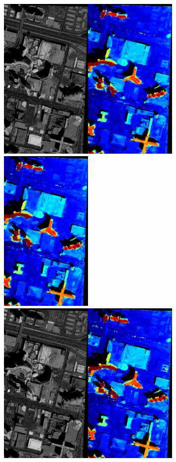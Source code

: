 \documentclass{article}
\theoremstyle{definition}
\begin{document}
\begin{figure}[ht]
 \centering
 \includegraphics[height=8cm]{images/SkysatLR18_120/1521739947374_dmap_050.png}\hspace{-0.28em}
 \includegraphics[height=8cm]{images/SkysatLR18_240/1521741442733_dmap_050.png}\\
 \vspace{1em}
 \includegraphics[height=8cm]{images/SkysatLR18_120/1521739947374_dmap_025.png}\hspace{-0.28em}

\end{figure}
\end{document}
